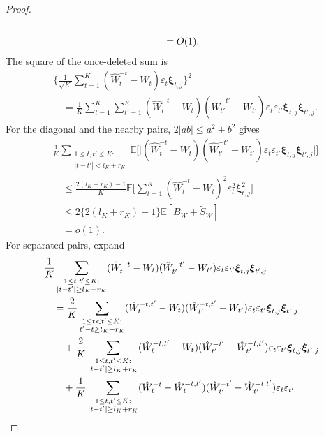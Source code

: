 \documentclass[12pt]{article}
\def\E{\mathbb{E}}
\numberwithin{equation}{section}
\begin{document}
\begin{proof}
\begin{align}
\notag\\
&\quad=O(1).
\label{eq:weight-V-deleted-moment}
\end{align}
The square of the once-deleted sum is
\begin{equation}
\label{eq:weight-V-square-expansion}
\begin{aligned}
&\Big\{\frac1{\sqrt K}\sum_{t=1}^K
(\hat W_t^{-t}-W_t)\varepsilon_t\boldsymbol\xi_{t,j}\Big\}^{2}\\
&\quad=\frac1K\sum_{t=1}^K\sum_{t'=1}^K
(\hat W_t^{-t}-W_t)(\hat W_{t'}^{-t'}-W_{t'})
\varepsilon_t\varepsilon_{t'}
\boldsymbol\xi_{t,j}\boldsymbol\xi_{t',j}.
\end{aligned}
\end{equation}
For the diagonal and the nearby pairs, \(2|ab|\leq a^2+b^2\) gives
\begin{align*}
&\frac1K\sum_{\substack{1\leq t,t'\leq K:\\
|t-t'|<l_K+r_K}}
\E\Big[
\Big|(\hat W_t^{-t}-W_t)(\hat W_{t'}^{-t'}-W_{t'})
\varepsilon_t\varepsilon_{t'}
\boldsymbol\xi_{t,j}\boldsymbol\xi_{t',j}\Big|
\Big]\\
&\quad\leq\frac{2(l_K+r_K)-1}{K}
\E\Big[\sum_{t=1}^K
(\hat W_t^{-t}-W_t)^2
\varepsilon_t^2\boldsymbol\xi_{t,j}^2\Big]\\
&\quad\leq2\{2(l_K+r_K)-1\}\E[B_W+\tilde S_W]\\
&\quad=o(1).
\end{align*}
For separated pairs, expand
\begin{align}
&\frac1K\sum_{\substack{1\leq t,t'\leq K:\\
|t-t'|\geq l_K+r_K}}
(\hat W_t^{-t}-W_t)(\hat W_{t'}^{-t'}-W_{t'})
\varepsilon_t\varepsilon_{t'}
\boldsymbol\xi_{t,j}\boldsymbol\xi_{t',j}\notag\\
&\quad=\frac2K\sum_{\substack{1\leq t<t'\leq K:\\
t'-t\geq l_K+r_K}}
(\hat W_t^{-t,t'}-W_t)(\hat W_{t'}^{-t,t'}-W_{t'})
\varepsilon_t\varepsilon_{t'}
\boldsymbol\xi_{t,j}\boldsymbol\xi_{t',j}\notag\\
&\qquad{}+\frac2K\sum_{\substack{1\leq t,t'\leq K:\\
|t-t'|\geq l_K+r_K}}
(\hat W_t^{-t,t'}-W_t)
(\hat W_{t'}^{-t'}-\hat W_{t'}^{-t,t'})
\varepsilon_t\varepsilon_{t'}
\boldsymbol\xi_{t,j}\boldsymbol\xi_{t',j}\notag\\
&\qquad{}+\frac1K\sum_{\substack{1\leq t,t'\leq K:\\
|t-t'|\geq l_K+r_K}}
(\hat W_t^{-t}-\hat W_t^{-t,t'})
(\hat W_{t'}^{-t'}-\hat W_{t'}^{-t,t'})
\varepsilon_t\varepsilon_{t'}

\end{align}
\end{proof}
\end{document}
